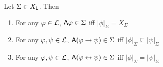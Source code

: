 \begin{lemma}
\label{exp_lemma_xsigma_properties}
    Let $\Sigma \in X_{\mathsf{L}}$. Then
    \begin{enumerate}
        \item\label{exp_item_xsigma_mem} For any $\varphi \in \mathcal{L}$, $\mathsf{A}\varphi \in
            \Sigma$ iff $|\phi|_\Sigma = X_\Sigma$

        \item\label{exp_item_xsigma_imp} For any $\varphi, \psi \in \mathcal{L}$, $\mathsf{A}(\varphi
            \to \psi) \in \Sigma$ iff $|\phi|_\Sigma \subseteq
            |\psi|_\Sigma$

        \item\label{exp_item_xsigma_iff} For any $\varphi, \psi \in \mathcal{L}$, $\mathsf{A}(\varphi
            \leftrightarrow \psi) \in \Sigma$ iff $|\phi|_\Sigma = |\psi|_\Sigma$
    \end{enumerate}
\end{lemma}

